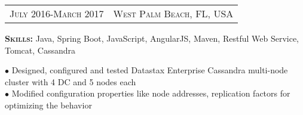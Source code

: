 \documentclass[10pt,a4paper,oneside]{article}
\begin{document}
\begin{minipage}[t]{0.55\textwidth}
        \textcolor{light-gray}{
            \begin{tabular}{c|c}
                {\small J\textsc{uly 2016}-M\textsc{arch 2017}}
                &{\small W\textsc{est} P\textsc{alm} B\textsc{each}, F\textsc{L}, U\textsc{SA}}
            \end{tabular}
        }
        \vspace{2mm}
        \begin{adjustwidth}{7pt}{0pt}
            \textbf{S\textsc{kills: }} \small{Java, Spring Boot, JavaScript, AngularJS, Maven, Restful Web Service, Tomcat, Cassandra}
        \end{adjustwidth}
        \vspace{1mm}
        \begin{adjustwidth}{7pt}{0pt}
            {\footnotesize $\bullet$ Designed, configured and tested Datastax Enterprise Cassandra multi-node cluster with 4 DC and 5 nodes each \\
            $\bullet$ Modified configuration properties like node addresses, replication factors for optimizing the behavior}\\
        \end{adjustwidth}        
    \end{minipage}
    \hspace{2ex}
\end{document}
